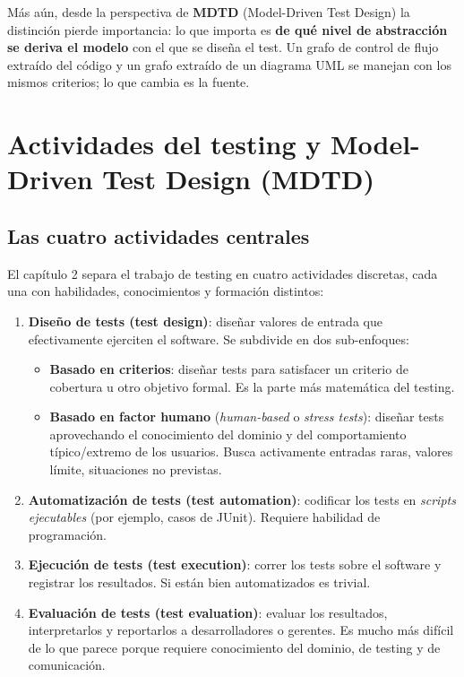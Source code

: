 \documentclass[12pt,a4paper]{article}
\begin{document}
Más aún, desde la perspectiva de \textbf{MDTD} (Model-Driven Test Design) la distinción pierde importancia: lo que importa es \textbf{de qué nivel de abstracción se deriva el modelo} con el que se diseña el test. Un grafo de control de flujo extraído del código y un grafo extraído de un diagrama UML se manejan con los mismos criterios; lo que cambia es la fuente.

\section{Actividades del testing y Model-Driven Test Design (MDTD)}
\subsection{Las cuatro actividades centrales}
El capítulo 2 separa el trabajo de testing en cuatro actividades discretas, cada una con habilidades, conocimientos y formación distintos:

\begin{enumerate}
  \item \textbf{Diseño de tests (test design)}: diseñar valores de entrada que efectivamente ejerciten el software. Se subdivide en dos sub-enfoques:
    \begin{itemize}
      \item \textbf{Basado en criterios}: diseñar tests para satisfacer un criterio de cobertura u otro objetivo formal. Es la parte más matemática del testing.
      \item \textbf{Basado en factor humano} (\textit{human-based} o \textit{stress tests}): diseñar tests aprovechando el conocimiento del dominio y del comportamiento típico/extremo de los usuarios. Busca activamente entradas raras, valores límite, situaciones no previstas.
    \end{itemize}
  \item \textbf{Automatización de tests (test automation)}: codificar los tests en \textit{scripts ejecutables} (por ejemplo, casos de JUnit). Requiere habilidad de programación.
  \item \textbf{Ejecución de tests (test execution)}: correr los tests sobre el software y registrar los resultados. Si están bien automatizados es trivial.
  \item \textbf{Evaluación de tests (test evaluation)}: evaluar los resultados, interpretarlos y reportarlos a desarrolladores o gerentes. Es mucho más difícil de lo que parece porque requiere conocimiento del dominio, de testing y de comunicación.
\end{enumerate}
\end{document}

